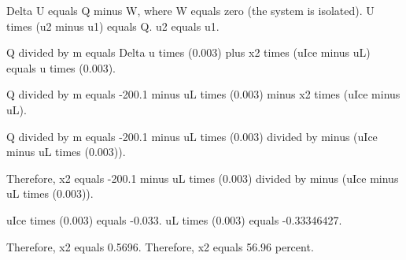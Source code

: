 Delta U equals Q minus W, where W equals zero (the system is isolated).  
U times (u2 minus u1) equals Q.  
u2 equals u1.  

Q divided by m equals Delta u times (0.003) plus x2 times (uIce minus uL) equals u times (0.003).  

Q divided by m equals -200.1 minus uL times (0.003) minus x2 times (uIce minus uL).  

Q divided by m equals -200.1 minus uL times (0.003) divided by minus (uIce minus uL times (0.003)).  

Therefore, x2 equals -200.1 minus uL times (0.003) divided by minus (uIce minus uL times (0.003)).  

uIce times (0.003) equals -0.033.  
uL times (0.003) equals -0.33346427.  

Therefore, x2 equals 0.5696.  
Therefore, x2 equals 56.96 percent.